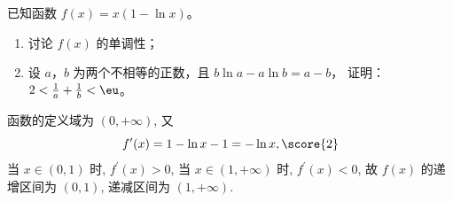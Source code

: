 \documentclass{exam-zh}
\begin{document}
\begin{problem}[points = 12]
  已知函数 $f(x) = x (1 - \ln x)$。
  \begin{enumerate}
    \item 讨论 $f(x)$ 的单调性；
    \item 设 $a$，$b$ 为两个不相等的正数，且 $b \ln a - a \ln b = a - b$，
      证明：$2 < \frac{1}{a} + \frac{1}{b} < \eu$。
  \end{enumerate}
  \begin{solution}
    函数的定义域为 $(0, +\infty)$,
    又 \[f^{\prime}(x) = 1 - \ln x-1 = -\ln x, \score{2}\]
    当 $x \in(0, 1)$ 时, $f^{\prime}(x) > 0$, 当 $x \in(1, +\infty)$ 时, $f^{\prime}(x) < 0$,
    故 $f(x)$ 的递增区间为 $(0,1)$, 递减区间为 $(1, +\infty)$.
  \end{solution}
\end{problem}
\end{document}
